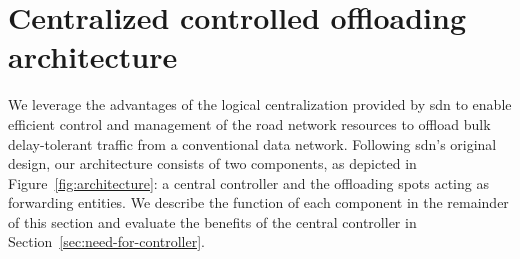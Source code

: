  




\section{Centralized controlled offloading architecture}
\label{sec:offloading-system-operations}

We leverage the advantages of the logical centralization provided by \acrfull{sdn} to enable efficient control and management of the road network resources to offload bulk delay-tolerant traffic from a conventional data network. Following \acrshort{sdn}'s original design, our architecture consists of two components, as depicted in Figure~\ref{fig:architecture}: a central controller and the offloading spots acting as forwarding entities. We describe the function of each component in the remainder of this section and evaluate the benefits of the central controller in Section~\ref{sec:need-for-controller}. 

